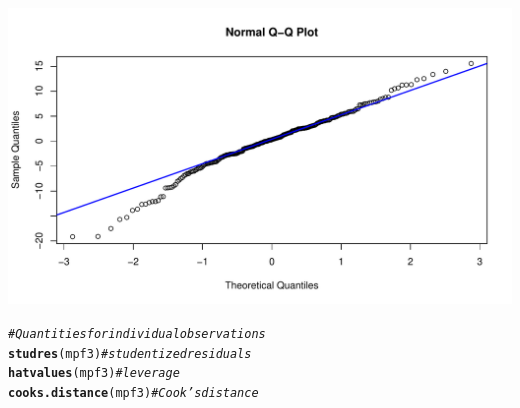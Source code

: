 \documentclass[oneside]{book}\usepackage[]{graphicx}\usepackage[dvipsnames,table,xcdraw]{xcolor}
\makeatletter
\def\maxwidth{ %
  \ifdim\Gin@nat@width>\linewidth
    \linewidth
  \else
    \Gin@nat@width
  \fi
}
\newcommand{\hlcom}[1]{\textcolor[rgb]{0.678,0.584,0.686}{\textit{#1}}}%
\newcommand{\hlstd}[1]{\textcolor[rgb]{0.345,0.345,0.345}{#1}}%
\newcommand{\hlkwd}[1]{\textcolor[rgb]{0.737,0.353,0.396}{\textbf{#1}}}%
\newenvironment{kframe}{%
 \def\at@end@of@kframe{}%
 \ifinner\ifhmode%
  \def\at@end@of@kframe{\end{minipage}}%
  \begin{minipage}{\columnwidth}%
 \fi\fi%
 \def\FrameCommand##1{\hskip\@totalleftmargin \hskip-\fboxsep
 \colorbox{shadecolor}{##1}\hskip-\fboxsep
     \hskip-\linewidth \hskip-\@totalleftmargin \hskip\columnwidth}%
 \MakeFramed {\advance\hsize-\width
   \@totalleftmargin\z@ \linewidth\hsize
   \@setminipage}}%
 {\par\unskip\endMakeFramed%
 \at@end@of@kframe}
\newenvironment{knitrout}{}{} %
\makeatother
\begin{document}
\begin{knitrout}
{\centering \includegraphics[width=\maxwidth]{figure/unnamed-chunk-56-3} 

}


\end{knitrout}
\begin{knitrout}
\color{fgcolor}\begin{kframe}
\begin{alltt}
\hlcom{# Quantities for individual observations}
\hlkwd{studres}\hlstd{(mpf3)}  \hlcom{# studentized residuals}
\hlkwd{hatvalues}\hlstd{(mpf3)}  \hlcom{# leverage}
\hlkwd{cooks.distance}\hlstd{(mpf3)}  \hlcom{# Cook's distance}
\end{alltt}
\end{kframe}
\end{knitrout}
\end{document}
